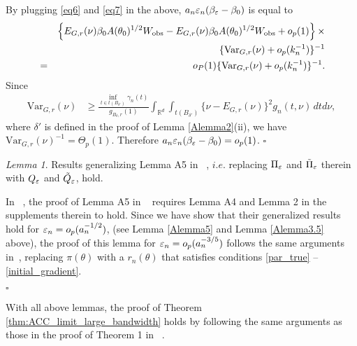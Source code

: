 \documentclass[9pt]{article}
\theoremstyle{remark}
\newtheorem{lemma}{Lemma}
\newcommand{\ST}[1]{{\color{blue}{#1}}}
\begin{document}
	By plugging \eqref{eq6} and \eqref{eq7} in the above, $a_{n}\varepsilon_{n}(\beta_{\varepsilon}-\beta_{0})$
	is equal to 
	\begin{eqnarray*}
		&  & \left\{ E_{G,r}(\nu)\beta_{0}A(\theta_{0})^{1/2}W_{\rm obs}-E_{G,r}(\nu)\beta_{0}A(\theta_{0})^{1/2}W_{\rm obs}+o_{p}(1)\right\} \times \\
		&  & \hspace{1cm}
		\{\text{Var}_{G,r}(\nu)+o_{p}(k_{n}^{-1})\}^{-1}\\
		&=& o_{P}(1)\{\text{Var}_{G,r}(\nu)+o_{p}(k_{n}^{-1})\}^{-1}.
	\end{eqnarray*}
	Since
	\begin{align*}
	\text{Var}_{G,r}(\nu) & \geq\frac{\inf_{t\in t(B_{\delta'})}\gamma_{n}(t)}{g_{B_{\delta},r}(1)}\int_{\mathbb{R}^{d}}\int_{t(B_{\delta'})}\{\nu-E_{G,r}(\nu)\}^{2}g_{n}(t,\nu)\,dtd\nu,
	\end{align*}
	where $\delta'$ is defined in the proof of Lemma \ref{Alemma2}(ii),
	we have $\text{Var}_{G,r}(\nu)^{-1}=\Theta_{p}(1)$. Therefore $a_{n}\varepsilon_{n}(\beta_{\varepsilon}-\beta_{0})=o_{p}(1)$.
	\hfill{$\square$} 

\begin{lemma}\label{Alemma6} Results generalizing Lemma A5 in ~\cite{Li2017},
	$i.e.$ replacing $\Pi_{\varepsilon}$ and $\tilde{\Pi}_{\varepsilon}$ therein with
	$Q_{\varepsilon}$ and $\tilde{Q}_{\varepsilon}$, hold. \end{lemma} 
	In ~\cite{Li2017}, the proof of Lemma A5 in ~\cite{Li2017} requires Lemma A4 and Lemma 2 in the supplements therein to hold. Since we have show that their generalized results hold for $\varepsilon_{n}=o_{p}(a_{n}^{-1/2})$, (see Lemma \ref{Alemma5} and Lemma \ref{Alemma3.5} above),
    the proof of this lemma for $\varepsilon_{n}=o_{p}(a_{n}^{-3/5})$ follows the same arguments in~\cite{Li2017}, replacing $\pi(\theta)$ with a $r_n(\theta)$ that satisfies conditions \ref{par_true} -- \ref{initial_gradient}.

 	\hfill{$\square$} 


	

With all above lemmas, the proof of Theorem \ref{thm:ACC_limit_large_bandwidth} holds by following the same arguments as those in the proof of Theorem 1 in ~\cite{Li2017}.




	
\end{document}
